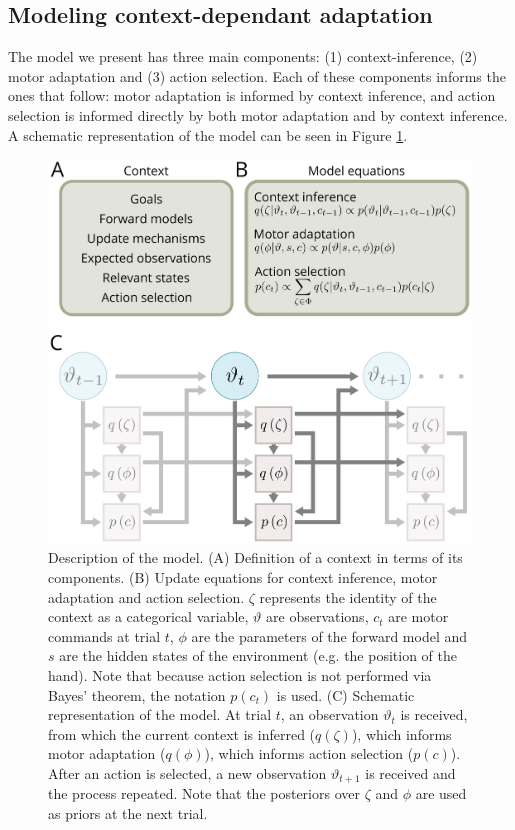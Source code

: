 \documentclass[a4paper,doc,floatsintext,natbib]{apa6}
\def \fref #1{Figure \ref{#1}}     %
\begin{document}
\subsection{Modeling context-dependant adaptation}
The model we present has three main components: (1) context-inference, (2) motor adaptation and (3) action selection. Each of these components informs the ones that follow: motor adaptation is informed by context inference, and action selection is informed directly by both motor adaptation and by context inference. A schematic representation of the model can be seen in \fref{fig:model}.

\begin{figure}
\centering
\includegraphics[]{./figures/figure_1.png}
\caption{Description of the model. (A) Definition of a context in terms of its components. (B) Update equations for context inference, motor adaptation and action selection. $\zeta$ represents the identity of the context as a categorical variable, $\vartheta$ are observations, $c_t$ are motor commands at trial $t$, $\phi$ are the parameters of the forward model and $s$ are the hidden states of the environment (e.g. the position of the hand). Note that because action selection is not performed via Bayes' theorem, the notation $p(c_t)$ is used. (C) Schematic representation of the model. At trial $t$, an observation $\vartheta_t$ is received, from which the current context is inferred ($q(\zeta)$), which informs motor adaptation ($q(\phi)$), which informs action selection ($p(c)$). After an action is selected, a new observation $\vartheta_{t+1}$ is received and the process repeated. Note that the posteriors over $\zeta$ and $\phi$ are used as priors at the next trial.}
\label{fig:model}
\end{figure}
\end{document}
